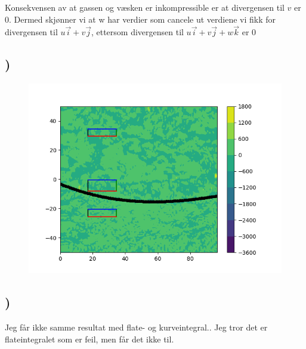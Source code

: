 \documentclass[a4paper,10pt,norsk]{article}
\begin{document}
Konsekvensen av at gassen og væsken er inkompressible er at divergensen til $v$ er 0. 
Dermed skjønner vi at w har verdier som cancele ut verdiene vi fikk for divergensen til $u\vec{i} + v\vec{j}$, ettersom divergensen til $u\vec{i} + v\vec{j} + w\vec{k}$ er 0


\subsection{)}


\begin{figure}[h!]
        \centering 
        \includegraphics[scale=0.9]{oppg_e.png} 
\end{figure}

\subsection{)}

Jeg får ikke samme resultat med flate- og kurveintegral.. Jeg tror det er flateintegralet som er feil, men får det ikke til.


\end{document}
